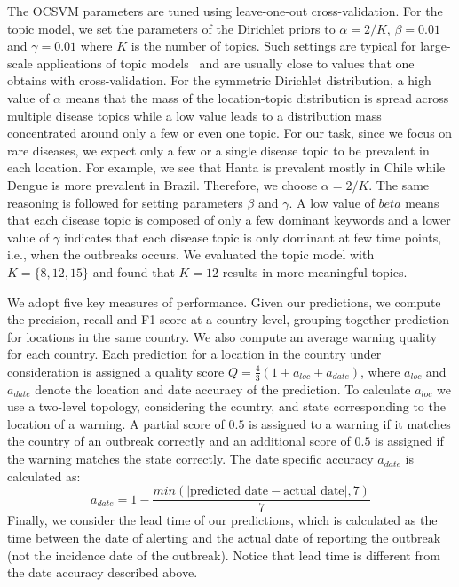 \documentclass[twoside,leqno,twocolumn]{article}
\begin{document}
\vspace{5pt} The OCSVM parameters are tuned using leave-one-out cross-validation. For the topic model, we set the parameters of the Dirichlet priors to $\alpha = 2/K$, $\beta = 0.01$ and $\gamma = 0.01$ where $K$ is the number of topics. Such settings are typical for large-scale applications of topic models~\cite{Jagarlamudi:2012:ILP:2380816.2380844, Porteous:2008:FCG:1401890.1401960, steyvers2007probabilistic} and are usually close to values that one obtains with cross-validation. For the symmetric Dirichlet distribution, a high value of $\alpha$ means that the mass of the location-topic distribution is spread across multiple disease topics while a low value leads to a distribution mass concentrated around only a few or even one topic. For our task, since we focus on rare diseases, we expect only a few or a single disease topic to be prevalent in each location. For example, we see that Hanta is prevalent mostly in Chile while Dengue is more prevalent in Brazil. Therefore, we choose $\alpha = 2/K$. The same reasoning is followed for setting parameters $\beta$ and $\gamma$. A low value of $beta$ means that each disease topic is composed of only a few dominant keywords and a lower value of $\gamma$ indicates that each disease topic is only dominant at few time points, i.e., when the outbreaks occurs. We evaluated the topic model with $K = \{8, 12, 15\}$ and found that $K=12$ results in more meaningful topics. 


\vspace{5pt} We adopt five key measures of performance. Given our predictions, we compute the precision, recall and F1-score at a country level, grouping together prediction for locations in the same country. We also compute an average warning quality for each country. Each prediction for a location in the country under consideration is assigned a quality score $Q = \frac{4}{3}(1 + a_{loc} + a_{date})$, where $a_{loc}$ and $a_{date}$ denote the location and date accuracy of the prediction. To calculate $a_{loc}$ we use a two-level topology, considering the country, and state corresponding to the location of a warning. A partial score of $0.5$ is assigned to a warning if it matches the country of an outbreak correctly and an additional score of $0.5$ is assigned if the warning matches the state correctly. The date specific accuracy $a_{date}$ is calculated as: 
\begin{equation} 
a_{date} = 1 - \frac{min(|\mbox{predicted date} - \mbox{actual date}|,7)}{7}
\end{equation}
Finally, we consider the lead time of our predictions, which is calculated as the time between the date of alerting and the actual date of reporting the outbreak (not the incidence date of the outbreak). Notice that lead time is different from the date accuracy described above.  
\end{document}
